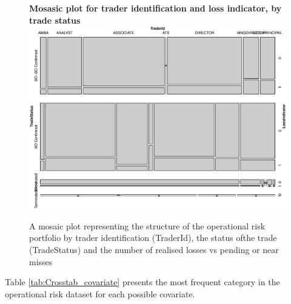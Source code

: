 \documentclass[]{DissertateUSU}
\begin{document}
\singlespacing

\begin{figure}
\centering
\textbf{Mosasic plot for trader identification and loss indicator, by trade status}
\includegraphics[width=\linewidth,height=0.75\linewidth]{Mosaic_Contingency.eps}
\caption[Portfolio structure by trader, trade status and number of realised losses]{A mosaic plot representing the structure of the operational risk portfolio by trader identification (TraderId), the status ofthe trade (TradeStatus) and the number of realised losses vs pending or near misses}
\label{Mosaic_Contingency}
\end{figure}

\doublespacing

Table \ref{tab:Crosstab_covariate} presents the most frequent category
in the operational risk dataset for each possible covariate.
\end{document}
